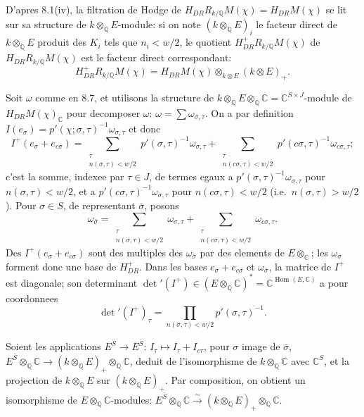 \documentclass[12pt,a4paper]{article}
\theoremstyle{plain}
\theoremstyle{definition}
\theoremstyle{remark}
\DeclareMathOperator{\Hom}{Hom}
\newcommand{\Q}{\mathbb{Q}}
\newcommand{\C}{\mathbb{C}}
\begin{document}
D'apres 8.1(iv), la filtration de Hodge de $H_{DR} R_{k/\Q} M(\chi) = H_{DR} M(\chi)$ se lit
sur sa structure de $k \otimes_\Q E$-module: si on note $(k \otimes_\Q E)_i$ le facteur direct de
$k \otimes_\Q E$ produit des $K_i$ tels que $n_i < w/2$, le quotient $H_{DR}^+ R_{k/\Q} M(\chi)$
de $H_{DR} R_{k/\Q} M(\chi)$ est le facteur direct correspondant:
\[
H_{DR}^+ R_{k/\Q} M(\chi) = H_{DR} M(\chi) \otimes_{k \otimes E} (k \otimes E)_+.
\]

Soit $\omega$ comme en 8.7, et utilisons la structure de
$k \otimes_\Q E \otimes_\Q \C = \C^{S \times J}$-module de $H_{DR} M(\chi)_\C$ pour decomposer
$\omega$: $\omega = \sum \omega_{\sigma,\tau}$. On a par definition $I(e_\sigma) =
p'(\chi; \sigma, \tau)^{-1} \omega_{\sigma,\tau}$ et donc
\[
I^+(e_\sigma + e_{c\sigma}) = \sum_{\substack{\tau \\ n(\sigma,\tau) < w/2}} p'(\sigma, \tau)^{-1} \omega_{\sigma,\tau}
+ \sum_{\substack{\tau \\ n(c\sigma,\tau) < w/2}} p'(c\sigma, \tau)^{-1} \omega_{c\sigma,\tau};
\]
c'est la somme, indexee par $\tau \in J$, de termes egaux a $p'(\sigma, \tau)^{-1} \omega_{\sigma,\tau}$
pour $n(\sigma, \tau) < w/2$, et a $p'(c\sigma, \tau)^{-1} \omega_{\sigma,\tau}$ pour
$n(c\sigma, \tau) < w/2$ (i.e.~$n(\sigma, \tau) > w/2$). Pour $\sigma \in S$, de representant
$\bar{\sigma}$, posons
\[
\omega_{\bar{\sigma}} = \sum_{\substack{\tau \\ n(\sigma,\tau) < w/2}} \omega_{\sigma,\tau}
+ \sum_{\substack{\tau \\ n(c\sigma,\tau) < w/2}} \omega_{c\sigma,\tau}.
\]
Des $I^+(e_\sigma + e_{c\sigma})$ sont des multiples des $\omega_{\bar{\sigma}}$ par des elements de
$E \otimes_\C$; les $\omega_{\bar{\sigma}}$ forment donc une base de $H_{DR}^+$. Dans les bases
$e_\sigma + e_{c\sigma}$ et $\omega_{\bar{\sigma}}$, la matrice de $I^+$ est diagonale; son determinant
$\det'(I^+) \in (E \otimes_\Q \C)^* = \C^{\Hom(E,\C)}$ a pour coordonnees
\[
\det'(I^+)_\tau = \prod_{n(\sigma,\tau) < w/2} p'(\sigma, \tau)^{-1}.
\]

Soient les applications $E^{\bar{S}} \to E^{\bar{S}}$: $I_\tau \mapsto I_\tau + I_{c\tau}$, pour $\sigma$ image de
$\bar{\sigma}$, $E^{\bar{S}} \otimes_\Q \C \to (k \otimes_\Q E)_+ \otimes_\Q \C$, deduit de l'isomorphisme de
$k \otimes_\Q \C$ avec $\C^S$, et la projection de $k \otimes_\Q E$ sur $(k \otimes_\Q E)_+$. Par
composition, on obtient un isomorphisme de $E \otimes_\Q \C$-modules:
$E^{\bar{S}} \otimes_\Q \C \xrightarrow{\sim} (k \otimes_\Q E)_+ \otimes_\Q \C$.
\end{document}

